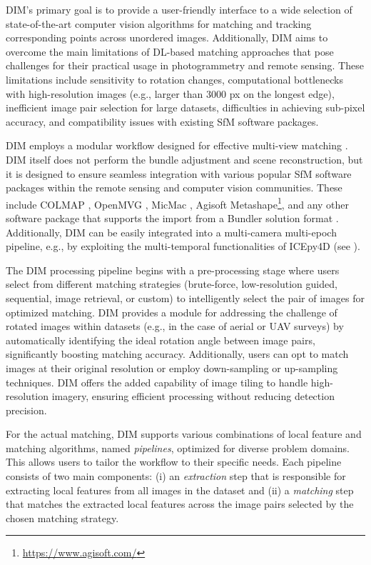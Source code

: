 DIM's primary goal is to provide a user-friendly interface to a wide selection of state-of-the-art computer vision algorithms for matching and tracking corresponding points across unordered images.
Additionally, DIM aims to overcome the main limitations of DL-based matching approaches that pose challenges for their practical usage in photogrammetry and remote sensing. 
These limitations include sensitivity to rotation changes, computational bottlenecks with high-resolution images (e.g., larger than 3000 px on the longest edge), inefficient image pair selection for large datasets, difficulties in achieving sub-pixel accuracy, and compatibility issues with existing SfM software packages.  

DIM employs a modular workflow designed for effective multi-view matching .
DIM itself does not perform the bundle adjustment and scene reconstruction, but it is designed to ensure seamless integration with various popular SfM software packages within the remote sensing and computer vision communities. 
These include COLMAP \citep{schoenberger2016sfm}, OpenMVG \citep{moulon2016openmvg}, MicMac \citep{rupnik2017micmac}, Agisoft Metashape\footnote{\url{https://www.agisoft.com/}}, 
and any other software package that supports the import from a Bundler solution format \citep{Li_Snavely_2018_MegaDepth}.
Additionally, DIM can be easily integrated into a multi-camera multi-epoch pipeline, e.g., by exploiting the multi-temporal functionalities of ICEpy4D (see ).

The DIM processing pipeline begins with a pre-processing stage where users select from different matching strategies (brute-force, low-resolution guided, sequential, image retrieval, or custom) to intelligently select the pair of images for optimized matching. 
DIM provides a module for addressing the challenge of rotated images within datasets (e.g., in the case of aerial or UAV surveys) by automatically identifying the ideal rotation angle between image pairs, significantly boosting matching accuracy.
Additionally, users can opt to match images at their original resolution or employ down-sampling or up-sampling techniques.
DIM offers the added capability of image tiling to handle high-resolution imagery, ensuring efficient processing without reducing detection precision. 

For the actual matching, DIM supports various combinations of local feature and matching algorithms, named \textit{pipelines}, optimized for diverse problem domains. 
This allows users to tailor the workflow to their specific needs. 
Each pipeline consists of two main components: (i) an \textit{extraction} step that is responsible for extracting local features from all images in the dataset and (ii) a \textit{matching} step that matches the extracted local features across the image pairs selected by the chosen matching strategy.  

